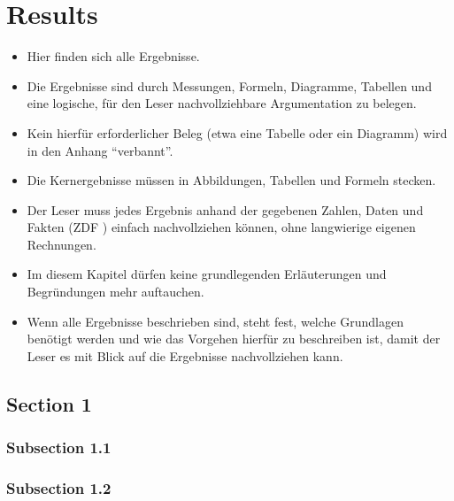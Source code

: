 
\chapter{Results} %
\label{chap:results}

\begin{itemize}
  \item Hier finden sich alle Ergebnisse.
  \item Die Ergebnisse sind durch Messungen, Formeln, Diagramme, Tabellen und eine logische, für den Leser nachvollziehbare Argumentation zu belegen.
  \item Kein hierfür erforderlicher Beleg (etwa eine Tabelle oder ein Diagramm) wird in den Anhang "`verbannt"'.
  \item Die Kernergebnisse müssen in Abbildungen, Tabellen und Formeln stecken.
  \item Der Leser muss jedes Ergebnis anhand der gegebenen Zahlen, Daten und Fakten (ZDF ) einfach nachvollziehen können, ohne langwierige eigenen Rechnungen.
  \item Im diesem Kapitel dürfen keine grundlegenden Erläuterungen und Begründungen mehr auftauchen.
  \item Wenn alle Ergebnisse beschrieben sind, steht fest, welche Grundlagen benötigt werden und wie das Vorgehen hierfür zu beschreiben ist, damit der Leser es mit Blick auf die Ergebnisse nachvollziehen kann.
\end{itemize}

\section{Section 1}

\subsection{Subsection 1.1}



\subsection{Subsection 1.2}



